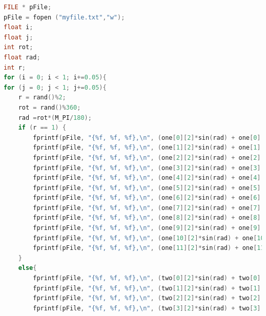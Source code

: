 \documentclass[journal,10pt,onecolumn,compsoc]{IEEEtran}
\begin{document}
\begin{lstlisting}[language=C++]
FILE * pFile;
pFile = fopen ("myfile.txt","w");
float i;
float j;
int rot;
float rad;
int r;
for (i = 0; i < 1; i+=0.05){
for (j = 0; j < 1; j+=0.05){
    r = rand()%2;
    rot = rand()%360;
    rad =rot*(M_PI/180);
    if (r == 1) {
        fprintf(pFile, "{%f, %f, %f},\n", (one[0][2]*sin(rad) + one[0][0]*cos(rad)) + j, 0.000000, (one[0][2]*cos(rad) - one[0][0]*sin(rad)) + i);
        fprintf(pFile, "{%f, %f, %f},\n", (one[1][2]*sin(rad) + one[1][0]*cos(rad)) + j, 0.000000, (one[1][2]*cos(rad) - one[1][0]*sin(rad)) + i);
        fprintf(pFile, "{%f, %f, %f},\n", (one[2][2]*sin(rad) + one[2][0]*cos(rad)) + j, 0.000000, (one[2][2]*cos(rad) - one[2][0]*sin(rad)) + i);
        fprintf(pFile, "{%f, %f, %f},\n", (one[3][2]*sin(rad) + one[3][0]*cos(rad)) + j, 0.060000, (one[3][2]*cos(rad) - one[3][0]*sin(rad)) + i);
        fprintf(pFile, "{%f, %f, %f},\n", (one[4][2]*sin(rad) + one[4][0]*cos(rad)) + j, 0.060000, (one[4][2]*cos(rad) - one[4][0]*sin(rad)) + i);
        fprintf(pFile, "{%f, %f, %f},\n", (one[5][2]*sin(rad) + one[5][0]*cos(rad)) + j, 0.120000, (one[5][2]*cos(rad) - one[5][0]*sin(rad)) + i);
        fprintf(pFile, "{%f, %f, %f},\n", (one[6][2]*sin(rad) + one[6][0]*cos(rad)) + j, 0.120000, (one[6][2]*cos(rad) - one[6][0]*sin(rad)) + i);
        fprintf(pFile, "{%f, %f, %f},\n", (one[7][2]*sin(rad) + one[7][0]*cos(rad)) + j, 0.162500, (one[7][2]*cos(rad) - one[7][0]*sin(rad)) + i);
        fprintf(pFile, "{%f, %f, %f},\n", (one[8][2]*sin(rad) + one[8][0]*cos(rad)) + j, 0.120000, (one[8][2]*cos(rad) - one[8][0]*sin(rad)) + i);
        fprintf(pFile, "{%f, %f, %f},\n", (one[9][2]*sin(rad) + one[9][0]*cos(rad)) + j, 0.060000, (one[9][2]*cos(rad) - one[9][0]*sin(rad)) + i);
        fprintf(pFile, "{%f, %f, %f},\n", (one[10][2]*sin(rad) + one[10][0]*cos(rad)) + j, 0.000000, (one[10][2]*cos(rad) - one[10][0]*sin(rad)) + i);
        fprintf(pFile, "{%f, %f, %f},\n", (one[11][2]*sin(rad) + one[11][0]*cos(rad)) + j, 0.000000, (one[11][2]*cos(rad) - one[11][0]*sin(rad)) + i);
    }
    else{
        fprintf(pFile, "{%f, %f, %f},\n", (two[0][2]*sin(rad) + two[0][0]*cos(rad)) + j, 0.000000, (two[0][2]*cos(rad) - two[0][0]*sin(rad)) + i);
        fprintf(pFile, "{%f, %f, %f},\n", (two[1][2]*sin(rad) + two[1][0]*cos(rad)) + j, 0.000000, (two[1][2]*cos(rad) - two[1][0]*sin(rad)) + i);
        fprintf(pFile, "{%f, %f, %f},\n", (two[2][2]*sin(rad) + two[2][0]*cos(rad)) + j, 0.055000, (two[2][2]*cos(rad) - two[2][0]*sin(rad)) + i);
        fprintf(pFile, "{%f, %f, %f},\n", (two[3][2]*sin(rad) + two[3][0]*cos(rad)) + j, 0.350000, (two[3][2]*cos(rad) - two[3][0]*sin(rad)) + i);

\end{lstlisting}
\end{document}
